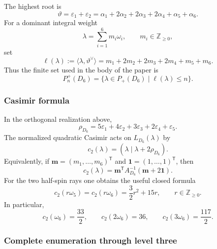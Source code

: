 \documentclass[11pt,reqno]{amsart}
\theoremstyle{definition}
\theoremstyle{remark}
\begin{document}
The highest root is
\begin{equation*}
  \vartheta
  =\varepsilon_1+\varepsilon_2
  =\alpha_1+2\alpha_2+2\alpha_3+2\alpha_4
   +\alpha_5+\alpha_6.
\end{equation*}
For a dominant integral weight
\[
  \lambda=\sum_{i=1}^{6}m_i\omega_i,
  \qquad m_i\in\mathbb Z_{\ge0},
\]
set
\begin{equation}
  \ell(\lambda)
  :=\langle\lambda,\vartheta^\vee\rangle
  =m_1+2m_2+2m_3+2m_4+m_5+m_6.
  \label{e7:eq:E7-appendix-D6-level-function}
\end{equation}
Thus the finite set used in the body of the paper is
\begin{equation*}
  P_n^+(D_6)
  =\{\lambda\in P_+(D_6)\mid \ell(\lambda)\le n\}.
\end{equation*}

\subsubsection{Casimir formula}


In the orthogonal realization above,
\begin{equation*}
  \rho_{D_6}
  =5\varepsilon_1+4\varepsilon_2+3\varepsilon_3
   +2\varepsilon_4+\varepsilon_5.
\end{equation*}
The normalized quadratic Casimir acts on $L_{D_6}(\lambda)$ by
\begin{equation*}
  c_2(\lambda)
  =(\lambda\mid\lambda+2\rho_{D_6}).
\end{equation*}
Equivalently, if
$\mathbf m=(m_1,\ldots,m_6)^{\mathsf T}$ and
$\mathbf1=(1,\ldots,1)^{\mathsf T}$, then
\begin{equation*}
  c_2(\lambda)
  =\mathbf m^{\mathsf T}A_{D_6}^{-1}
   (\mathbf m+2\mathbf1).
\end{equation*}
For the two half-spin rays one obtains the useful closed formula
\begin{equation*}
  c_2(r\omega_5)=c_2(r\omega_6)
  =\frac32r^2+15r,
  \qquad r\in\mathbb Z_{\ge0}.
\end{equation*}
In particular,
\begin{equation*}
  c_2(\omega_6)=\frac{33}{2},
  \qquad
  c_2(2\omega_6)=36,
  \qquad
  c_2(3\omega_6)=\frac{117}{2}.
\end{equation*}

\subsubsection{Complete enumeration through level three}
\end{document}
